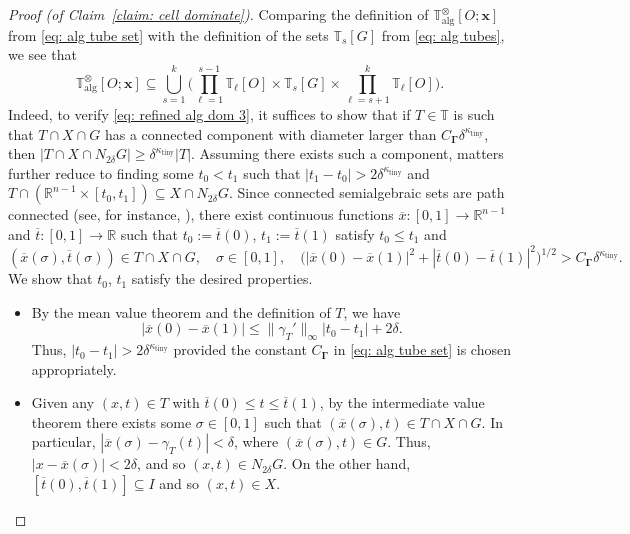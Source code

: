 \documentclass[reqno]{amsart}
\numberwithin{equation}{section}
\newcommand{\R}{\mathbb{R}}
\newcommand{\T}{\mathbb{T}}
\newcommand{\bx}{\mathbf{x}}
\newcommand{\bdGamma}{\boldsymbol{\Gamma}}
\theoremstyle{plain}
\theoremstyle{definition}
\newcommand{\ttiny}{\mathrm{tiny}}
\newcommand{\alg}{\mathrm{alg}}
\begin{document}
\begin{proof}[Proof (of Claim~\ref{claim: cell dominate})]
Comparing the definition of $\T^{\otimes}_{\alg}[O;\bx]$ from \eqref{eq: alg tube set} with the definition of the sets $\T_s[G]$ from \eqref{eq: alg tubes}, we see that 
\begin{equation}\label{eq: refined alg dom 3}
   \T^{\otimes}_{\alg}[O;\bx] \subseteq \bigcup_{s = 1}^k  \Bigg(\prod_{\ell = 1}^{s-1} \T_{\ell}[O] \times \T_s[G] \times \prod_{\ell = s+1}^{k} \T_{\ell}[O] \Bigg).
\end{equation}
Indeed, to verify \eqref{eq: refined alg dom 3}, it suffices to show that if $T \in \T$ is such that $T \cap X \cap G$ has a connected component with diameter larger than $C_{\bdGamma}\delta^{\kappa_{\ttiny}}$, then $|T \cap X \cap N_{2\delta} G| \geq \delta^{\kappa_{\ttiny}}|T|$. Assuming there exists such a component, matters further reduce to finding some $t_0 < t_1$ such that $|t_1 - t_0| > 2 \delta^{\kappa_{\ttiny}}$ and $T \cap (\R^{n-1} \times [t_0, t_1]) \subseteq X \cap N_{2\delta}G$. Since connected semialgebraic sets are path connected (see, for instance, \cite[Theorem 5.23]{BPR2006}), there exist continuous functions $\overline{x} \colon [0,1] \to \R^{n-1}$ and $\overline{t} \colon [0,1] \to \R$ such that $t_0 := \overline{t}(0)$, $t_1 := \overline{t}(1)$ satisfy $t_0 \leq t_1$ and
\begin{equation*}
(\overline{x}(\sigma), \overline{t}(\sigma)) \in T \cap X \cap G, \quad  \sigma \in [0,1], \quad \big(|\overline{x}(0) - \overline{x}(1)|^2 + |\overline{t}(0) - \overline{t}(1)|^2\big)^{1/2} > C_{\bdGamma} \delta^{\kappa_{\ttiny}}. 
\end{equation*}
We show that $t_0$, $t_1$ satisfy the desired properties.
\begin{itemize}
    \item By the mean value theorem and the definition of $T$, we have
    \begin{equation*}
        |\overline{x}(0) - \overline{x}(1)| \leq \|\gamma_T'\|_{\infty}|t_0 - t_1| + 2 \delta.
    \end{equation*}
    Thus, $|t_0 - t_1| > 2 \delta^{\kappa_{\ttiny}}$ provided the constant $C_{\bdGamma}$ in \eqref{eq: alg tube set} is chosen appropriately. 
    \item Given any $(x,t) \in T$ with $\overline{t}(0) \leq t \leq \overline{t}(1)$, by the intermediate value theorem there exists some $\sigma \in [0,1]$ such that $(\overline{x}(\sigma), t) \in T \cap X \cap G$. In particular, $|\overline{x}(\sigma) - \gamma_T(t)| < \delta$, where $(\overline{x}(\sigma), t) \in G$. Thus, $|x - \overline{x}(\sigma)| < 2\delta$, and so $(x,t) \in N_{2 \delta}G$.  On the other hand, $[\overline{t}(0), \overline{t}(1)] \subseteq I$ and so $(x,t) \in X$. 
\end{itemize}


\end{proof}
\end{document}
